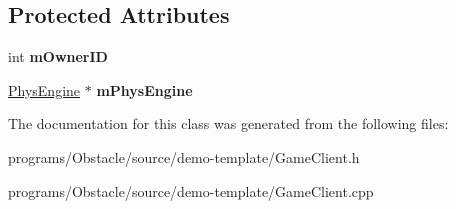 \subsection*{Protected Attributes}
\begin{DoxyCompactItemize}
\item 
int {\bfseries m\+Owner\+ID}\hypertarget{classns__phys_1_1_game_client_a8b54a332f3399473ac8ec04b0f883cd0}{}\label{classns__phys_1_1_game_client_a8b54a332f3399473ac8ec04b0f883cd0}

\item 
\hyperlink{classns__phys_1_1_phys_engine}{Phys\+Engine} $\ast$ {\bfseries m\+Phys\+Engine}\hypertarget{classns__phys_1_1_game_client_aa411777f888606df2fa1bcee324d93d6}{}\label{classns__phys_1_1_game_client_aa411777f888606df2fa1bcee324d93d6}

\end{DoxyCompactItemize}


The documentation for this class was generated from the following files\+:\begin{DoxyCompactItemize}
\item 
programs/\+Obstacle/source/demo-\/template/Game\+Client.\+h\item 
programs/\+Obstacle/source/demo-\/template/Game\+Client.\+cpp\end{DoxyCompactItemize}
